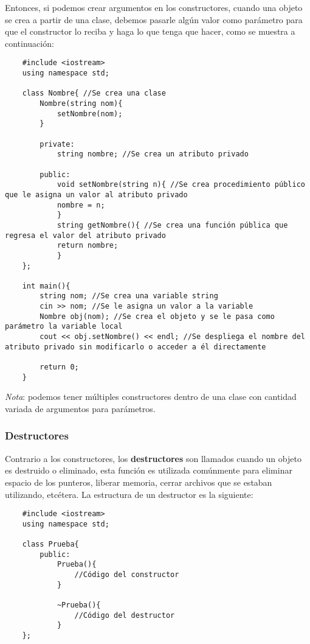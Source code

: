 Entonces, si podemos crear argumentos en los constructores, cuando una objeto se crea a partir de una clase, debemos pasarle algún valor como parámetro para que el constructor lo reciba y haga lo que tenga que hacer, como se muestra a continuación:
\begin{lstlisting}
    #include <iostream>
    using namespace std;

    class Nombre{ //Se crea una clase
        Nombre(string nom){
            setNombre(nom);
        }
        
        private:
            string nombre; //Se crea un atributo privado
        
        public:
            void setNombre(string n){ //Se crea procedimiento público que le asigna un valor al atributo privado
            nombre = n;
            }
            string getNombre(){ //Se crea una función pública que regresa el valor del atributo privado
            return nombre;
            }
    };
    
    int main(){
        string nom; //Se crea una variable string
        cin >> nom; //Se le asigna un valor a la variable
        Nombre obj(nom); //Se crea el objeto y se le pasa como parámetro la variable local
        cout << obj.setNombre() << endl; //Se despliega el nombre del atributo privado sin modificarlo o acceder a él directamente
        
        return 0;
    }
\end{lstlisting}

\textit{Nota}: podemos tener múltiples constructores dentro de una clase con cantidad variada de argumentos para parámetros.


\subsubsection{Destructores}
\hspace{0.55cm}Contrario a los constructores, los \textbf{destructores} son llamados cuando un objeto es destruido o eliminado, esta función es utilizada comúnmente para eliminar espacio de los punteros, liberar memoria, cerrar archivos que se estaban utilizando, etcétera. La estructura de un destructor es la siguiente:
\begin{lstlisting}
    #include <iostream>
    using namespace std;

    class Prueba{
        public:
            Prueba(){
                //Código del constructor
            }
            
            ~Prueba(){
                //Código del destructor
            }
    };
\end{lstlisting}

